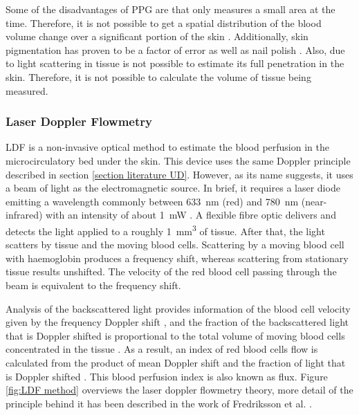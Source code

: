 Some of the disadvantages of PPG are that only measures a small area at the time. Therefore, it is not possible to get a spatial distribution of the blood volume change over a significant portion of the skin \cite{wu2003ppgi}. Additionally, skin pigmentation has proven to be a factor of error as well as nail polish \cite{fallow2013influence}. Also, due to light scattering in tissue is not possible to estimate its full penetration in the skin. Therefore, it is not possible to calculate the volume of tissue being measured.


\subsubsection{Laser Doppler Flowmetry}
\label{section literature LDF}
LDF is a non-invasive optical method to estimate the blood perfusion in the microcirculatory bed under the skin. This device uses the same Doppler principle described in section \ref{section literature UD}. However, as its name suggests, it uses a beam of light as the electromagnetic source. In brief, it requires a laser diode emitting a wavelength commonly between \SI{633}{\nano\metre} (red) and \SI{780}{\nano\metre} (near-infrared) with an intensity of about \SI{1}{\milli\watt} \cite{fredriksson2007laser}. A flexible fibre optic delivers and detects the light applied to a roughly \SI{1}{\cubic\mm} of tissue. After that, the light scatters by tissue and the moving blood cells. Scattering by a moving blood cell with haemoglobin produces a frequency shift, whereas scattering from stationary tissue results unshifted. The velocity of the red blood cell passing through the beam is equivalent to the frequency shift. 

Analysis of the backscattered light provides information of the blood cell velocity given by the frequency Doppler shift \cite{dirnagl1989continuous,fredriksson2007laser}, and the fraction of the backscattered light that is Doppler shifted is proportional to the total volume of moving blood cells concentrated in the tissue \cite{dirnagl1989continuous}. As a result, an index of red blood cells flow is calculated from the product of mean Doppler shift and the fraction of light that is Doppler shifted \cite{dirnagl1989continuous}. This blood perfusion index is also known as flux. Figure \ref{fig:LDF method} overviews the laser doppler flowmetry theory, more detail of the principle behind it has been described in the work of Fredriksson et al. \cite{fredriksson2007laser}.  

